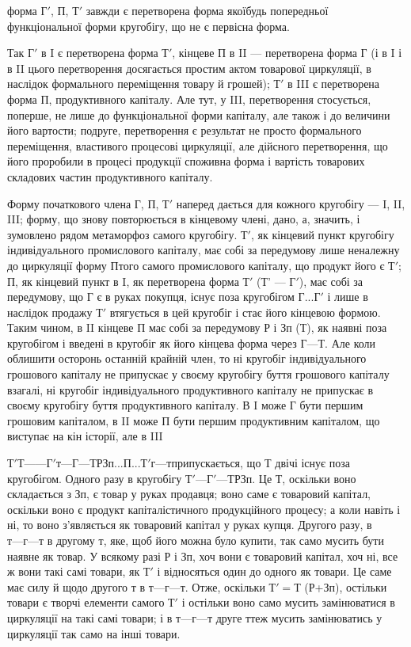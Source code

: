 \parcont{}  %
форма $Г'$, П, $Т'$ завжди є перетворена форма якоїбудь попередньої функціональної форми кругобігу, що
не є первісна форма.

Так $Г'$ в I є перетворена форма $Т'$, кінцеве П в II — перетворена форма Г (і в I і в II цього
перетворення досягається простим актом товарової циркуляції, в наслідок формального переміщення
товару й грошей); $Т'$ в III є перетворена форма П, продуктивного капіталу. Але тут, у III,
перетворення стосується, поперше, не лише до функціональної форми капіталу, але також і до величини
його вартости; подруге, перетворення є результат не просто формального переміщення, властивого
процесові циркуляції, але дійсного перетворення, що його проробили в процесі продукції споживна
форма і вартість товарових складових частин продуктивного капіталу.

Форму початкового члена Г, П, $Т'$ наперед дається для кожного кругобігу — I, II, III; форму, що знову
повторюється в кінцевому члені, дано, а, значить, і зумовлено рядом метаморфоз самого кругобігу. $Т'$,
як кінцевий пункт кругобігу індивідуального промислового капіталу, має собі за передумову лише
неналежну до циркуляції форму $П т$ого самого промислового капіталу, що продукт його є $Т'$; П, як
кінцевий пункт в I, як перетворена форма $Т'$ (Т' — $Г'$), має собі за передумову, що Г є в руках
покупця, існує поза кругобігом $Г... Г'$ і лише в наслідок продажу $Т'$ втягується в цей кругобіг і стає
його кінцевою формою. Таким чином, в II кінцеве П має собі за передумову Р і Зп (Т), як наявні поза
кругобігом і введені в кругобіг як його кінцева форма через $Г — Т$. Але коли облишити осторонь
останній крайній член, то ні кругобіг індивідуального грошового капіталу не припускає у своєму
кругобігу буття грошового капіталу взагалі, ні кругобіг індивідуального
продуктивного капіталу не припускає в своєму кругобігу буття продуктивного капіталу. В I може Г бути
першим грошовим капіталом, в II може П бути першим продуктивним капіталом, що виступає на кін
історії, але в III

$Т' Т — — Г' т — Г — Т Р Зп... П... Т' г — т

п$рипускається, що Т двічі існує поза кругобігом. Одного разу в кругобігу $Т' — Г' — Т Р Зп$. Це Т,
оскільки воно складається з Зп, є товар у руках продавця; воно саме є товаровий капітал, оскільки
воно є продукт капіталістичного продукційного процесу; а коли навіть і ні, то воно з’являється як
товаровий капітал у руках купця. Другого разу, в $т — г — т$ в другому т, яке, щоб його можна було
купити, так само мусить бути наявне як товар. У всякому разі Р і Зп, хоч вони є товаровий
капітал, хоч ні, все ж вони такі самі товари, як $Т'$ і відносяться один до одного як товари. Це
саме має силу й щодо другого т в $т — г — т$. Отже, оскільки $Т' = Т$ (Р+Зп), остільки товари є творчі
елементи самого $Т'$ і остільки воно само мусить замінюватися в циркуляції на такі самі товари; і в $т
— г — т$ друге $т т$еж мусить замінюватись у циркуляції так само на інші товари.

